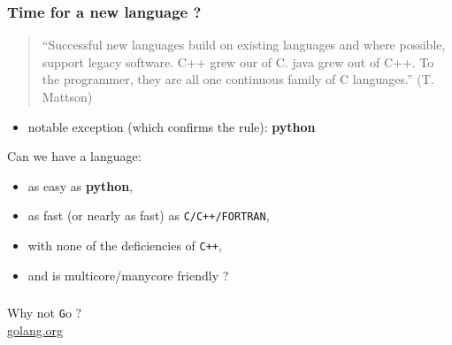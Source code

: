 \documentclass[bigger]{beamer}
\providecommand{\alert}[1]{\textbf{#1}}
\begin{document}
\begin{frame}
\frametitle{Time for a new language ?}
\label{sec-1-6}
\begin{quotation} %
\label{sec-1-6-1}

 ``Successful new languages build on existing languages and where possible, support legacy software. C++ grew our of C. java grew out of C++. To the programmer, they are all one continuous family of C languages.''
 (T. Mattson)
\end{quotation}
\quad
\label{sec-1-6-2}


\begin{itemize}
\item notable exception (which confirms the rule): \alert{python}
\end{itemize}
\begin{alertblock}{\quad}
\label{sec-1-6-3}

    Can we have a language:
\begin{itemize}
\item as easy as \alert{python},
\item as fast (or nearly as fast) as \verb~C/C++/FORTRAN~,
\item with none of the deficiencies of \verb~C++~,
\item and is multicore/manycore friendly ?
\end{itemize}
\end{alertblock}
\end{frame}
\begin{frame}
\frametitle{\quad}
\label{sec-1-7}


\begin{center}
Why not {\texttt Go} ?\\
\href{http://golang.org}{{\color{blue}golang.org}}
\end{center}
\end{frame}
\end{document}
